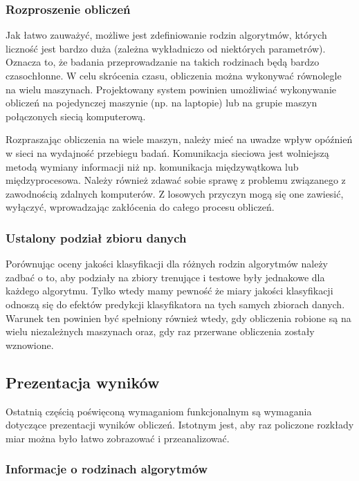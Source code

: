 \documentclass[../thesis.tex]{subfiles}
\begin{document}
\subsubsection{Rozproszenie obliczeń}

Jak łatwo zauważyć, możliwe jest zdefiniowanie rodzin algorytmów, których liczność jest bardzo duża (zależna wykładniczo od niektórych parametrów). Oznacza to, że badania przeprowadzanie na takich rodzinach będą bardzo czasochłonne. W celu skrócenia czasu, obliczenia można wykonywać równolegle na wielu maszynach. Projektowany system powinien umożliwiać wykonywanie obliczeń na pojedynczej maszynie (np. na laptopie) lub na grupie maszyn połączonych siecią komputerową.

Rozpraszając obliczenia na wiele maszyn, należy mieć na uwadze wpływ opóźnień w sieci na wydajność przebiegu badań. Komunikacja sieciowa jest wolniejszą metodą wymiany informacji niż np. komunikacja międzywątkowa lub międzyprocesowa. Należy również zdawać sobie sprawę z problemu związanego z zawodnością zdalnych komputerów. Z losowych przyczyn mogą się one zawiesić, wyłączyć, wprowadzając zakłócenia do całego procesu obliczeń. 

\subsubsection{Ustalony podział zbioru danych}

Porównując oceny jakości klasyfikacji dla różnych rodzin algorytmów należy zadbać o to, aby podziały na zbiory trenujące i testowe były jednakowe dla każdego algorytmu. Tylko wtedy mamy pewność że miary jakości klasyfikacji odnoszą się do efektów predykcji klasyfikatora na tych samych zbiorach danych. Warunek ten powinien być spełniony również wtedy, gdy obliczenia robione są na wielu niezależnych maszynach oraz, gdy raz przerwane obliczenia zostały wznowione.

\subsection{Prezentacja wyników}

Ostatnią częścią poświęconą wymaganiom funkcjonalnym są wymagania dotyczące prezentacji wyników obliczeń. Istotnym jest, aby raz policzone rozkłady miar można było łatwo zobrazować i przeanalizować.

\subsubsection{Informacje o rodzinach algorytmów}
\end{document}
